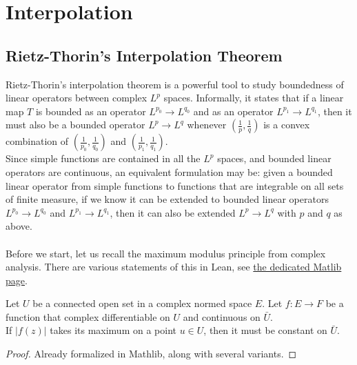 \chapter{Interpolation}
\label{chap:interpolation}

\section{Rietz-Thorin's Interpolation Theorem}
Rietz-Thorin's interpolation theorem is a powerful tool to study boundedness of linear operators between complex $L^p$ spaces.
Informally, it states that if a linear map $T$ is bounded as an operator $L^{p_0}\to L^{q_0}$ and as an operator $L^{p_1} \to L^{q_1}$, then
it must also be a bounded operator $L^p \to L^q$ whenever $\left(\frac{1}{p}, \frac{1}{q}\right)$ is a convex combination of $\left(\frac{1}{p_0}, \frac{1}{q_0}\right)$ and $\left(\frac{1}{p_1}, \frac{1}{q_1}\right)$.\\
Since simple functions are contained in all the $L^p$ spaces, and bounded linear operators are continuous, an equivalent formulation may be: given a bounded linear operator from simple functions to functions that are integrable on all sets of finite measure, if we know it can be extended to bounded linear
operators $L^{p_0} \to L^{q_0}$ and $L^{p_1} \to L^{q_1}$, then it can also be extended $L^p \to L^q$ with $p$ and $q$ as above.\\\\
Before we start, let us recall the maximum modulus principle from complex analysis.
There are various statements of this in Lean, see \href{https://leanprover-community.github.io/mathlib4_docs/Mathlib/Analysis/Complex/AbsMax.html}{the dedicated Matlib page}.

\begin{theorem}
    \label{thm:maximum_modulus}
    \leanok
    Let $U$ be a connected open set in a complex normed space $E$. Let $f:E\to F$ be a function that
    complex differentiable on $U$ and continuous on $\bar{U}$.\\
    If $|f(z)|$ takes its maximum on a point $u\in U$, then it must be constant on $\bar{U}$.
\end{theorem}
\begin{proof}
    \leanok
    Already formalized in Mathlib, along with several variants.
\end{proof}


